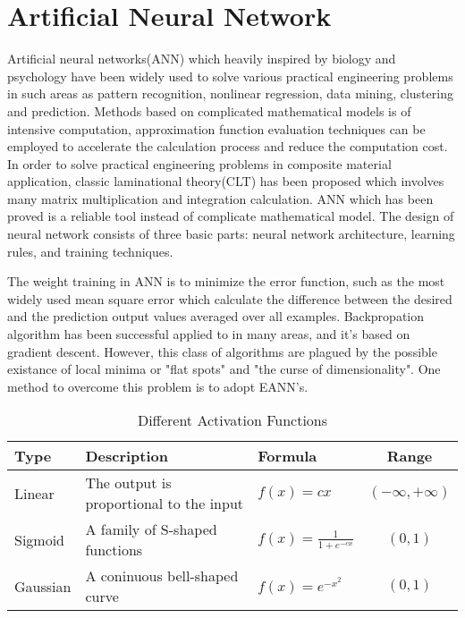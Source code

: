 \section{Artificial Neural Network}
Artificial neural networks(ANN) which heavily inspired by biology and psychology
have been widely used to solve various practical engineering problems in such
areas as pattern recognition, nonlinear regression, data mining, clustering and
prediction. Methods based on complicated mathematical models is of intensive
computation, approximation function evaluation techniques can be employed to
accelerate the calculation process and reduce the computation cost. In order to
solve practical engineering problems in composite material application, classic
laminational theory(CLT) has been proposed which involves many matrix
multiplication and integration calculation. ANN which has been proved is a
reliable tool instead of complicate mathematical model.  The design of neural
network consists of three basic parts: neural network architecture, learning
rules, and training techniques.

The weight training in ANN is to minimize the error function, such as the most
widely used mean square error which calculate the difference  between the
desired and the prediction output values averaged over all examples.
Backpropation algorithm has been successful applied to in many areas, and it's
based on gradient descent. However, this class of algorithms are  plagued by
the possible existance of local minima or "flat spots" and "the curse of
dimensionality". One method to overcome this problem is to adopt EANN's.







\begin{table}
\centering
\caption{Different Activation Functions}

\begin{tabular}{lllc}
		\toprule
		Type & Description  & Formula & Range  \\
		\midrule
		Linear & The output is proportional to the input & $f(x)=cx$ &
		$(-\infty, +\infty)$ \\ 
		Sigmoid & A family of S-shaped functions& $f(x)=\frac{1}{1+e^{-cx}}$ &
		$(0, 1)$ \\ 
		Gaussian & A coninuous bell-shaped curve & $f(x)=e^{-x^2}$ & $(0,1)$ \\ 
		\bottomrule
	\end{tabular}
\end{table}


